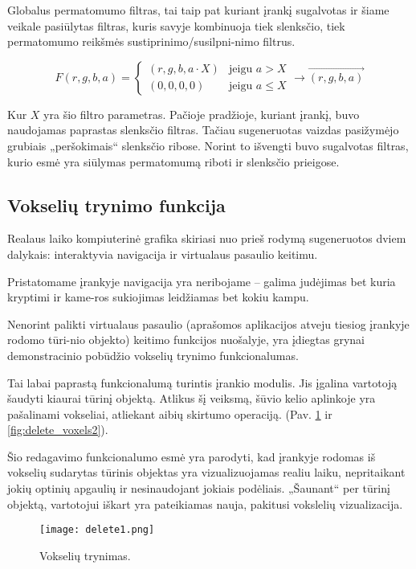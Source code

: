 Globalus permatomumo filtras, tai taip pat kuriant įrankį sugalvotas ir šiame
veikale pasiūlytas filtras, kuris savyje kombinuoja tiek slenksčio, tiek
permatomumo reikšmės sustiprinimo/susilpni-nimo filtrus.

$$
F(r, g, b, a) =
\left\{
  \begin{array}{ll}
  (r, g, b, a \cdot X) & \mbox{jeigu $a > X$}\\
  (0, 0, 0, 0) & \mbox{jeigu $a \leq X$}
  \end{array}
\right. \to \vec{(r, g, b, a)}
$$

Kur $X$ yra šio filtro parametras. Pačioje pradžioje, kuriant įrankį, buvo
naudojamas paprastas slenksčio filtras. Tačiau sugeneruotas vaizdas pasižymėjo
grubiais „peršokimais“ slenksčio ribose. Norint to išvengti buvo sugalvotas
filtras, kurio esmė yra siūlymas permatomumą riboti ir slenksčio prieigose.

\subsection{Vokselių trynimo funkcija}

Realaus laiko kompiuterinė grafika skiriasi nuo prieš rodymą sugeneruotos
dviem dalykais: interaktyvia navigacija ir virtualaus pasaulio keitimu.

Pristatomame įrankyje navigacija yra neribojame -- galima judėjimas bet kuria
kryptimi ir kame-ros sukiojimas leidžiamas bet kokiu kampu.

Nenorint palikti virtualaus pasaulio (aprašomos aplikacijos atveju tiesiog
įrankyje rodomo tūri-nio objekto) keitimo funkcijos nuošalyje, yra įdiegtas
grynai demonstracinio pobūdžio vokselių trynimo funkcionalumas.

Tai labai paprastą funkcionalumą turintis įrankio modulis. Jis įgalina
vartotoją šaudyti kiaurai tūrinį objektą. Atlikus šį veiksmą, šūvio kelio
aplinkoje yra pašalinami vokseliai, atliekant aibių skirtumo operaciją.
(Pav. \ref{fig:delete_voxels1} ir \ref{fig:delete_voxels2}).

Šio redagavimo funkcionalumo esmė yra parodyti, kad įrankyje rodomas iš
vokselių sudarytas tūrinis objektas yra vizualizuojamas realiu laiku,
nepritaikant jokių optinių apgaulių ir nesinaudojant jokiais podėliais.
„Šaunant“ per tūrinį objektą, vartotojui iškart yra pateikiamas nauja,
pakitusi vokslelių vizualizacija.

\begin{figure}[t]
\centering
\texttt{[image: delete1.png]}
\caption{Vokselių trynimas.}
\label{fig:delete_voxels1}
\end{figure}

